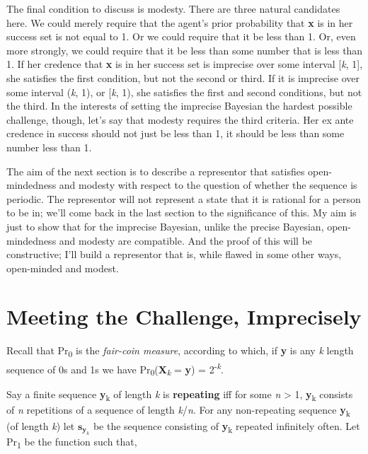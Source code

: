 \documentclass[
  10pt,
  letterpaper,
  DIV=11,
  numbers=noendperiod,
  twoside]{scrartcl}
\begin{document}
The final condition to discuss is modesty. There are three natural
candidates here. We could merely require that the agent's prior
probability that \textbf{x} is in her success set is not equal to 1. Or
we could require that it be less than 1. Or, even more strongly, we
could require that it be less than some number that is less than 1. If
her credence that \textbf{x} is in her success set is imprecise over
some interval {[}\emph{k}, 1{]}, she satisfies the first condition, but
not the second or third. If it is imprecise over some interval
(\emph{k}, 1), or {[}\emph{k}, 1), she satisfies the first and second
conditions, but not the third. In the interests of setting the imprecise
Bayesian the hardest possible challenge, though, let's say that modesty
requires the third criteria. Her ex ante credence in success should not
just be less than 1, it should be less than some number less than 1.

The aim of the next section is to describe a representor that satisfies
open-mindedness and modesty with respect to the question of whether the
sequence is periodic. The representor will not represent a state that it
is rational for a person to be in; we'll come back in the last section
to the significance of this. My aim is just to show that for the
imprecise Bayesian, unlike the precise Bayesian, open-mindedness and
modesty are compatible. And the proof of this will be constructive; I'll
build a representor that is, while flawed in some other ways,
open-minded and modest.

\section{Meeting the Challenge,
Imprecisely}\label{meeting-the-challenge-imprecisely}

Recall that Pr\textsubscript{0} is the \emph{fair-coin measure},
according to which, if \textbf{y} is any \emph{k} length sequence of 0s
and 1s we have Pr\textsubscript{0}(\textbf{X}\textsubscript{\emph{k}} =
\textbf{y}) = 2\textsuperscript{-\emph{k}}.

Say a finite sequence \textbf{y}\textsubscript{k} of length \emph{k} is
\textbf{repeating} iff for some \emph{n} \textgreater{} 1,
\textbf{y}\textsubscript{k} consists of \emph{n} repetitions of a
sequence of length \emph{k}/\emph{n}. For any non-repeating sequence
\textbf{y}\textsubscript{k} (of length \emph{k}) let
\(\boldsymbol{s}_{\boldsymbol{y}_k}\) be the sequence consisting of
\textbf{y}\textsubscript{k} repeated infinitely often. Let
Pr\textsubscript{1} be the function such that,
\end{document}
